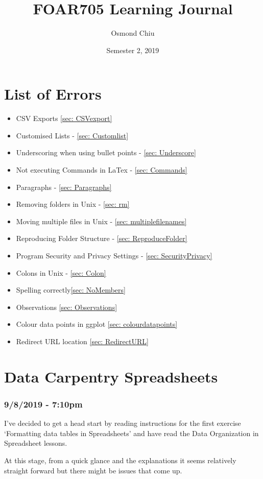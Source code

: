 \documentclass{article}
\title{FOAR705 Learning Journal}
\author{Osmond Chiu}
\date{Semester 2, 2019}
\begin{document}
\maketitle
\tableofcontents
 
\newpage



\section{List of Errors}\par
\begin{itemize}
    \item CSV Exports \ref{sec: CSVexport}
    \item Customised Lists - \ref{sec: Customlist}
    \item Underscoring when using bullet points - \ref{sec: Underscore}
    \item Not executing Commands in LaTex - \ref{sec: Commands}
    \item Paragraphs - \ref{sec: Paragraphs}\par
    \item Removing folders in Unix - \ref{sec: rm}\par
    \item Moving multiple files in Unix - \ref{sec: multiplefilenames}\par
    \item Reproducing Folder Structure - \ref{sec: ReproduceFolder}
    \item Program Security and Privacy Settings - \ref{sec: SecurityPrivacy}
    \item Colons in Unix - \ref{sec: Colon}
    \item Spelling correctly\ref{sec: NoMembers}
    \item Observations \ref{sec: Observations}
    \item Colour data points in ggplot \ref{sec: colourdatapoints}
    \item Redirect URL location \ref{sec: RedirectURL}

\end{itemize}



\par


\newpage
\section{Data Carpentry Spreadsheets}
\subsubsection*{9/8/2019 - 7:10pm}
I’ve decided to get a head start by reading instructions for the first exercise ‘Formatting data tables in Spreadsheets’ and have read the Data Organization in Spreadsheet lessons.\par
At this stage, from a quick glance and the explanations it seems relatively straight forward but there might be issues that come up.\par
\end{document}

